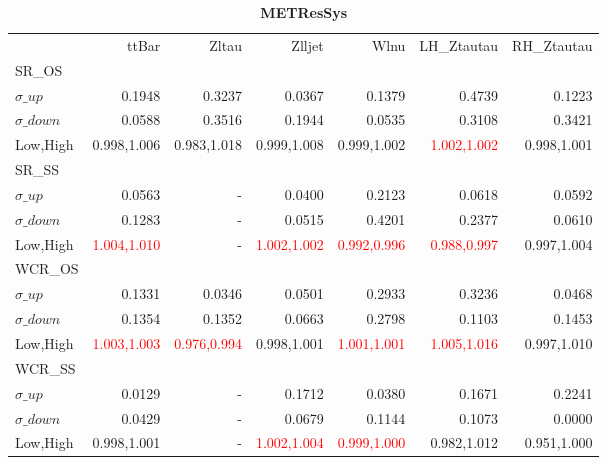 \documentclass[11pt,oneside,a4paper]{article}
\begin{document}
\begin{table}
\caption{\bf{METResSys}}
\centering
\begin{tabular}{lrrrrrr}
& ttBar & Zltau & Zlljet & Wlnu & LH\_Ztautau & RH\_Ztautau \\

SR\_OS &  &  &  &  &  &  \\
$\sigma\_up$ & 0.1948 & 0.3237 & 0.0367 & 0.1379 & 0.4739 & 0.1223 \\
$\sigma\_down$ & 0.0588 & 0.3516 & 0.1944 & 0.0535 & 0.3108 & 0.3421 \\
Low,High & 0.998,1.006 & 0.983,1.018 & 0.999,1.008 & 0.999,1.002 & \textcolor{red}{1.002,1.002} & 0.998,1.001 \\

\hline
SR\_SS &  &  &  &  &  &  \\
$\sigma\_up$ & 0.0563 & - & 0.0400 & 0.2123 & 0.0618 & 0.0592 \\
$\sigma\_down$ & 0.1283 & - & 0.0515 & 0.4201 & 0.2377 & 0.0610 \\
Low,High & \textcolor{red}{1.004,1.010} & - & \textcolor{red}{1.002,1.002} & \textcolor{red}{0.992,0.996} & \textcolor{red}{0.988,0.997} & 0.997,1.004 \\

\hline
WCR\_OS &  &  &  &  &  &  \\
$\sigma\_up$ & 0.1331 & 0.0346 & 0.0501 & 0.2933 & 0.3236 & 0.0468 \\
$\sigma\_down$ & 0.1354 & 0.1352 & 0.0663 & 0.2798 & 0.1103 & 0.1453 \\
Low,High & \textcolor{red}{1.003,1.003} & \textcolor{red}{0.976,0.994} & 0.998,1.001 & \textcolor{red}{1.001,1.001} & \textcolor{red}{1.005,1.016} & 0.997,1.010 \\

\hline
WCR\_SS &  &  &  &  &  &  \\
$\sigma\_up$ & 0.0129 & - & 0.1712 & 0.0380 & 0.1671 & 0.2241 \\
$\sigma\_down$ & 0.0429 & - & 0.0679 & 0.1144 & 0.1073 & 0.0000 \\
Low,High & 0.998,1.001 & - & \textcolor{red}{1.002,1.004} & \textcolor{red}{0.999,1.000} & 0.982,1.012 & 0.951,1.000 \\

\end{tabular}
\end{table}
\end{document}
